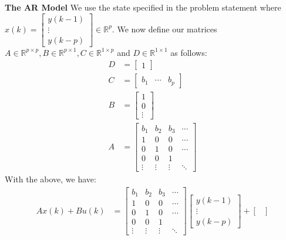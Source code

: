 \documentclass[12pt]{exam}
\begin{document}
\begin{questions}
\begin{solution}
\textbf{The AR Model}
We use the state specified in the problem statement where $x(k) = 
  \begin{bmatrix}
    y(k-1) \\
    \vdots \\
    y(k-p)
  \end{bmatrix} \in \mathbb{R}^p$. We now define our matrices $A \in \mathbb{R}^{p \times p}, B \in \mathbb{R}^{p \times 1}, C \in \mathbb{R}^{1 \times p}$ and $D \in \mathbb{R}^{1 \times 1}$ as follows:
\begin{align*}
  D &= 
    \begin{bmatrix}
      1
    \end{bmatrix} \\
  C &=
    \begin{bmatrix}
      b_1 & \cdots & b_p
    \end{bmatrix}\\
  B &=
    \begin{bmatrix}
      1 \\
      0 \\
      \vdots
    \end{bmatrix} \\
  A &= 
    \begin{bmatrix}
      b_1 & b_2 & b_3 & \cdots  \\
      1 & 0 & 0 & \cdots \\
      0 & 1 & 0 & \cdots \\
      0 & 0 & 1 \\
      \vdots & \vdots & \vdots & \ddots
    \end{bmatrix}
  \tag{Same as $A$ for AR model except first row is filled as shown}  
\end{align*}
With the above, we have:
\begin{align*}
  Ax(k) + Bu(k) &=
    \begin{bmatrix}
      b_1 & b_2 & b_3 & \cdots  \\
      1 & 0 & 0 & \cdots \\
      0 & 1 & 0 & \cdots \\
      0 & 0 & 1 \\
      \vdots & \vdots & \vdots & \ddots
    \end{bmatrix}
    \begin{bmatrix}
      y(k-1) \\
      \vdots \\
      y(k-p)
    \end{bmatrix} + 
    \begin{bmatrix}

\end{bmatrix}
\end{align*}
\end{solution}
\end{questions}
\end{document}
